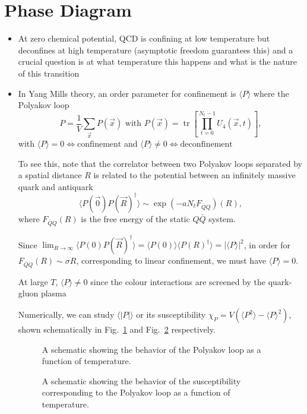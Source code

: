 \section{Phase Diagram}
\begin{itemize}
  \item At zero chemical potential, QCD is confining at low temperature but deconfines at high temperature (asymptotic freedom guarantees this) and a crucial question is at what temperature this happens and what is the nature of this transition
  \item In Yang Mills theory, an order parameter for confinement is $\langle P \rangle$ where the Polyakov loop
\begin{equation}
    P = \frac{1}{V}\sum_{\vec{x}} P(\vec{x}) \text{ with } P(\vec{x}) = \operatorname{tr} \left[ \prod _{t=0}^{N_t - 1} U_4(\vec{x}, t) \right],
\end{equation}
with $\langle P \rangle = 0 \Leftrightarrow \text{confinement}$ and $\langle P \rangle \neq 0 \Leftrightarrow \text{deconfinement}$

To see this, note that the correlator between two Polyakov loops separated by a spatial distance $R$ is related to the potential between an infinitely massive quark and antiquark
\begin{equation}
    \langle P(\vec{0})P(\vec{R})^\dagger \rangle \sim \exp{(-a N_t F_{\bar{Q}Q})(R)},
\end{equation}
where $F_{\bar{Q} Q}(R)$ is the free energy of the static $Q \bar{Q}$ system.

Since $\lim_{R\to\infty}\langle P(0)P(\vec{R})^\dagger \rangle = \langle P(0)\rangle \langle P(R)^\dagger\rangle = |\langle P \rangle |^2$, in order for $F_{\bar{Q}Q}(R) \sim \sigma R$, corresponding to linear confinement, we must have $\langle P \rangle = 0$.

At large $T$, $\langle P \rangle \neq 0$ since the colour interactions are screened by the quark-gluon plasma

Numerically, we can study $\langle | P |\rangle$ or its susceptibility $\chi_P = V(\langle P^2 \rangle - \langle P \rangle^2)$, shown schematically in Fig.~\ref{fig:polyakov} and Fig.~\ref{fig:sus} respectively.
\begin{figure}
    \centering
    \caption{A schematic showing the behavior of the Polyakov loop as a function of temperature.}
    \label{fig:polyakov}
\end{figure}
\begin{figure}
    \centering
    \caption{A schematic showing the behavior of the susceptibility corresponding to the Polyakov loop as a function of temperature.}
    \label{fig:sus}
\end{figure}


\end{itemize}
